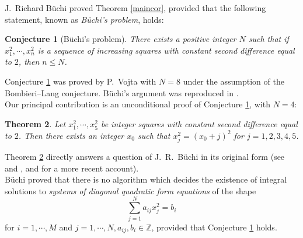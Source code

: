 \documentclass[letterpaper,10pt]{amsart}
\newcommand{\bZ}{{\mathbb{Z}}}
\newtheorem{theorem}{Theorem}[section]
\newtheorem{conjecture}[theorem]{Conjecture}
\theoremstyle{definition}
\numberwithin{equation}{section}
\begin{document}
	J.~Richard B\"{u}chi proved Theorem \ref{maincor}, provided that the following statement, known as \emph{B\"{u}chi's problem}, holds: 
	
	\begin{conjecture}[B\"{u}chi's problem] \label{Buchiconj}There exists a positive integer $N$ such that if $x_1^2, \cdots, x_n^2$ is a sequence of increasing squares with constant second difference equal to $2$, then $n \leq N$. 
	\end{conjecture} 
	
	Conjecture \ref{Buchiconj} was proved by P.~Vojta \cite{Voj} with $N = 8$ under the assumption of the Bombieri--Lang conjecture. B\"{u}chi's argument was reproduced in \cite{Voj}.\\
	
	Our principal contribution is an unconditional proof of Conjecture \ref{Buchiconj}, with $N = 4$: 
	
	\begin{theorem} \label{MT0} Let $x_1^2, \cdots, x_5^2$ be integer squares with constant second difference equal to $2$. Then there exists an integer $x_0$ such that $x_j^2 = (x_0 + j)^2$ for $j = 1, 2,3,4, 5$. 
	\end{theorem} 
	
	Theorem \ref{MT0} directly answers a question of J.~R.~B\"{u}chi in its original form (see \cite{Bu} and \cite{Maz}, and \cite{Pasel} for a more recent account).  \\
	
	B\"{u}chi proved that there is no algorithm which decides the existence of integral solutions to \emph{systems of diagonal quadratic form equations} of the shape 
	\begin{equation} \label{diag} \sum_{j=1}^N a_{ij} x_j^2 = b_i
	\end{equation}
	for $i = 1, \cdots, M$ and $j = 1, \cdots, N, a_{ij}, b_i \in \bZ$, provided that Conjecture \ref{Buchiconj} holds. \\
	
\end{document}
